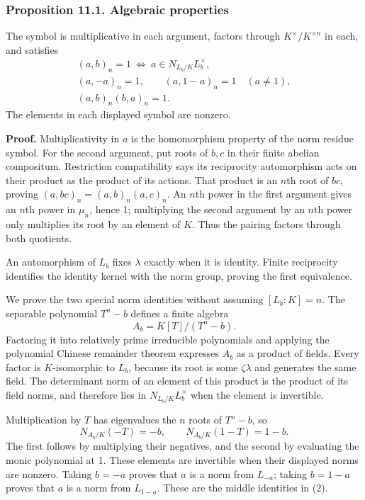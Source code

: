 \documentclass[11pt,a4paper]{article}
\begin{document}
\subsubsection{Proposition 11.1. Algebraic
properties}\label{proposition-11.1.-algebraic-properties}

The symbol is multiplicative in each argument, factors through
\(K^\times/K^{\times n}\) in each, and satisfies \[
\begin{gathered}
(a,b)_n=1\ \Longleftrightarrow\
 a\in N_{L_b/K}L_b^\times,\\
(a,-a)_n=1,\qquad (a,1-a)_n=1\quad(a\ne1),\\
(a,b)_n(b,a)_n=1.
\end{gathered}
\tag{2}
\] The elements in each displayed symbol are nonzero.

\textbf{Proof.} Multiplicativity in \(a\) is the homomorphism property
of the norm residue symbol. For the second argument, put roots of
\(b,c\) in their finite abelian compositum. Restriction compatibility
says its reciprocity automorphism acts on their product as the product
of its actions. That product is an \(n\)th root of \(bc\), proving
\((a,bc)_n=(a,b)_n(a,c)_n\). An \(n\)th power in the first argument
gives an \(n\)th power in \(\mu_n\), hence 1; multiplying the second
argument by an \(n\)th power only multiplies its root by an element of
\(K\). Thus the pairing factors through both quotients.

An automorphism of \(L_b\) fixes \(\lambda\) exactly when it is
identity. Finite reciprocity identifies the identity kernel with the
norm group, proving the first equivalence.

We prove the two special norm identities without assuming \([L_b:K]=n\).
The separable polynomial \(T^n-b\) defines a finite algebra \[
A_b=K[T]/(T^n-b).
\] Factoring it into relatively prime irreducible polynomials and
applying the polynomial Chinese remainder theorem expresses \(A_b\) as a
product of fields. Every factor is \(K\)-isomorphic to \(L_b\), because
its root is some \(\zeta\lambda\) and generates the same field. The
determinant norm of an element of this product is the product of its
field norms, and therefore lies in \(N_{L_b/K}L_b^\times\) when the
element is invertible.

Multiplication by \(T\) has eigenvalues the \(n\) roots of \(T^n-b\), so
\[
N_{A_b/K}(-T)=-b,\qquad
N_{A_b/K}(1-T)=1-b.
\tag{3}
\] The first follows by multiplying their negatives, and the second by
evaluating the monic polynomial at 1. These elements are invertible when
their displayed norms are nonzero. Taking \(b=-a\) proves that \(a\) is
a norm from \(L_{-a}\); taking \(b=1-a\) proves that \(a\) is a norm
from \(L_{1-a}\). These are the middle identities in (2).
\end{document}
